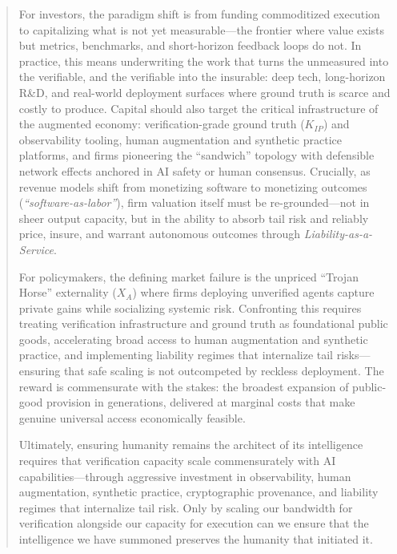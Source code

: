 \documentclass[12pt, letter]{article}
\begin{document}
\begin{abstract}
For investors, the paradigm shift is from funding commoditized execution to capitalizing what is not yet measurable—the frontier where value exists but metrics, benchmarks, and short-horizon feedback loops do not. In practice, this means underwriting the work that turns the unmeasured into the verifiable, and the verifiable into the insurable: deep tech, long-horizon R\&D, and real-world deployment surfaces where ground truth is scarce and costly to produce. Capital should also target the critical infrastructure of the augmented economy: verification-grade ground truth ($K_{IP}$) and observability tooling, human augmentation and synthetic practice platforms, and firms pioneering the ``sandwich'' topology with defensible network effects anchored in AI safety or human consensus. Crucially, as revenue models shift from monetizing software to monetizing outcomes (\emph{``software-as-labor''}), firm valuation itself must be re-grounded—not in sheer output capacity, but in the ability to absorb tail risk and reliably price, insure, and warrant autonomous outcomes through \emph{Liability-as-a-Service}.

For policymakers, the defining market failure is the unpriced ``Trojan Horse'' externality ($X_A$) where firms deploying unverified agents capture private gains while socializing systemic risk. Confronting this requires treating verification infrastructure and ground truth as foundational public goods, accelerating broad access to human augmentation and synthetic practice, and implementing liability regimes that internalize tail risks—ensuring that safe scaling is not outcompeted by reckless deployment. The reward is commensurate with the stakes: the broadest expansion of public-good provision in generations, delivered at marginal costs that make genuine universal access economically feasible.

Ultimately, ensuring humanity remains the architect of its intelligence requires that verification capacity scale commensurately with AI capabilities---through aggressive investment in observability, human augmentation, synthetic practice, cryptographic provenance, and liability regimes that internalize tail risk. Only by scaling our bandwidth for verification alongside our capacity for execution can we ensure that the intelligence we have summoned preserves the humanity that initiated it.



\end{abstract}

\vfill
\end{document}
